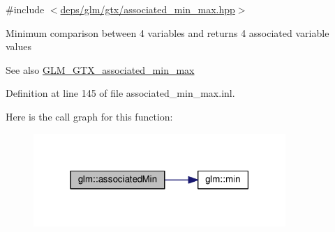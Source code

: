 {\ttfamily \#include $<$\hyperlink{associated__min__max_8hpp}{deps/glm/gtx/associated\+\_\+min\+\_\+max.\+hpp}$>$}

Minimum comparison between 4 variables and returns 4 associated variable values \begin{DoxySeeAlso}{See also}
\hyperlink{group__gtx__associated__min__max}{G\+L\+M\+\_\+\+G\+T\+X\+\_\+associated\+\_\+min\+\_\+max} 
\end{DoxySeeAlso}


Definition at line 145 of file associated\+\_\+min\+\_\+max.\+inl.

Here is the call graph for this function\+:
\nopagebreak
\begin{figure}[H]
\begin{center}
\leavevmode
\includegraphics[width=271pt]{d6/d10/group__gtx__associated__min__max_ga2db7e351994baee78540a562d4bb6d3b_cgraph}
\end{center}
\end{figure}
